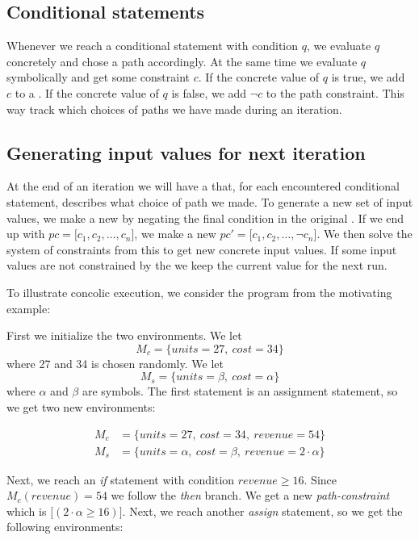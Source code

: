 	\subsection{Conditional statements}
	
	Whenever we reach a conditional statement with condition $q$, we evaluate $q$ concretely and chose a path accordingly. At the same time we evaluate $q$ symbolically and get some constraint $c$. If the concrete value of $q$ is true, we add $c$ to a \pc. If the concrete value of $q$ is false, we add $\neg c$ to the path constraint. This way track which choices of paths we have made during an iteration. 
	
	\subsection{Generating input values for next iteration}
	
	At the end of an iteration we will have a \pc that, for each encountered conditional statement, describes what choice of path we made. To generate a new set of input values, we make a new \pc by negating the final condition in the original \pc. If we end up with $pc = \lbrack c_1, c_2, \ldots, c_n \rbrack$, we make a new \pc $pc' = \lbrack c_1, c_2, \ldots, \neg c_n \rbrack$. We then solve the system of constraints from this \pc to get new concrete input values. If some input values are not constrained by the \pc we keep the current value for the next run.

\bigskip
To illustrate concolic execution, we consider the program from the motivating example:
\motexample

\noindent First we initialize the two environments. We let 
\begin{equation*}
	M_c = \{units = 27, \ cost = 34\}
\end{equation*}
 where 27 and 34 is chosen randomly. We let
\begin{equation*}
 	M_s = \{units =\beta, \ cost = \alpha\}
\end{equation*}
where $\alpha$ and $\beta$ are symbols. The first statement is an assignment statement, so we get two new environments:

\begin{align*}
	M_c & = \{units = 27, \ cost = 34, \ revenue = 54 \}\\
	M_s & = \{units = \alpha, \ cost = \beta, \ revenue = 2\cdot \alpha \}
\end{align*}

Next, we reach an \textsl{if} statement with condition $revenue \geq 16$. Since $M_c(revenue) = 54$ we follow the \textsl{then} branch. We get a new \emph{path-constraint} which is $\lbrack (2\cdot \alpha \geq 16) \rbrack$. Next, we reach another \textsl{assign} statement, so we get the following environments:

